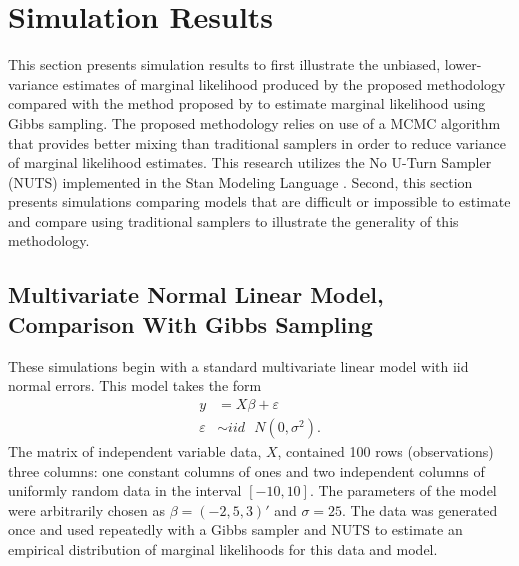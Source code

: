 \documentclass[twocolumn]{article}
\newcommand{\ep}{\varepsilon}
\begin{document}
\section{Simulation Results}

This section presents simulation results to first illustrate the unbiased, lower-variance estimates of marginal likelihood produced by the proposed methodology compared with the method proposed by \cite{Chib} to estimate marginal likelihood using Gibbs sampling. The proposed methodology relies on use of a MCMC algorithm that provides better mixing than traditional samplers in order to reduce variance of marginal likelihood estimates. This research utilizes the No U-Turn Sampler (NUTS) implemented in the Stan Modeling Language \citep{rstan}. Second, this section presents simulations comparing models that are difficult or impossible to estimate and compare using traditional samplers to illustrate the generality of this methodology.

\subsection{Multivariate Normal Linear Model, Comparison With Gibbs Sampling}



These simulations begin with a standard multivariate linear model with iid normal errors. This model takes the form
\begin{subequations}
\begin{align}
	y &= X\beta + \ep \\
	\ep &\sim iid \mbox{ }N(0, \sigma^2). 
\end{align}
\end{subequations}
The matrix of independent variable data, $X$, contained 100 rows (observations) three columns: one constant columns of ones and two independent columns of uniformly random data in the interval $[-10, 10]$. The parameters of the model were arbitrarily chosen as $\beta = (-2, 5, 3)'$ and $\sigma = 25$. The data was generated once and used repeatedly with a Gibbs sampler and NUTS to estimate an empirical distribution of marginal likelihoods for this data and model.
\end{document}
